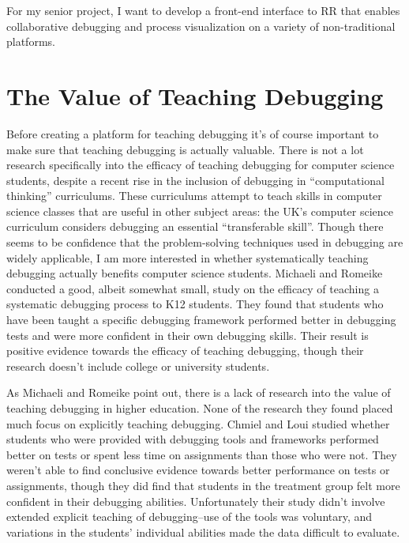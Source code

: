 \documentclass[12pt]{article}
\begin{document}
For my senior project, I want to develop a front-end interface to RR
that enables collaborative debugging and process visualization on a
variety of non-traditional platforms.

\section{The Value of Teaching Debugging}

Before creating a platform for teaching debugging it's of course
important to make sure that teaching debugging is actually valuable.
There is not a lot research specifically into the efficacy of teaching
debugging for computer science students, despite a recent rise in the
inclusion of debugging in ``computational thinking''
curriculums\cite{10.1145/3361721.3361724}.  These curriculums attempt
to teach skills in computer science classes that are useful in other
subject areas: the UK's computer science curriculum considers
debugging an essential ``transferable skill''\cite{10.1145/2602484}.
Though there seems to be confidence that the problem-solving
techniques used in debugging are widely applicable, I am more
interested in whether systematically teaching debugging actually
benefits computer science students.  Michaeli and Romeike conducted a
good, albeit somewhat small, study on the efficacy of teaching a
systematic debugging process to K12 students.  They found that
students who have been taught a specific debugging framework performed
better in debugging tests and were more confident in their own
debugging skills\cite{10.1145/3361721.3361724}.  Their result is
positive evidence towards the efficacy of teaching debugging, though
their research doesn't include college or university students.\par

As Michaeli and Romeike point out, there is a lack of research into
the value of teaching debugging in higher education.  None of the
research they found placed much focus on explicitly teaching
debugging.  Chmiel and Loui studied whether students who were provided
with debugging tools and frameworks performed better on tests or spent
less time on assignments than those who were
not\cite{10.1145/971300.971310}.  They weren't able to find conclusive
evidence towards better performance on tests or assignments, though
they did find that students in the treatment group felt more confident
in their debugging abilities.  Unfortunately their study didn't
involve extended explicit teaching of debugging--use of the tools was
voluntary, and variations in the students' individual abilities made
the data difficult to evaluate.\par
\end{document}
